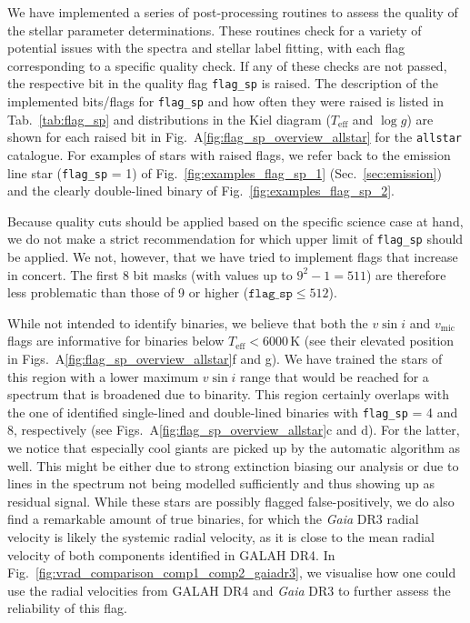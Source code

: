\documentclass[
  journal=pasa,
  manuscript=research-paper, %
  year=2024,
  volume=37
]{cup-journal}
\newcommand{\Teff}{$T_\mathrm{eff}$\xspace}
\newcommand{\logg}{$\log g$\xspace}
\newcommand{\vmic}{$v_\mathrm{mic}$\xspace}
\newcommand{\vsini}{$v \sin i$\xspace}
\newcommand{\Gaia}{\textit{Gaia}\xspace}
\begin{document}
We have implemented a series of post-processing routines to assess the quality of the stellar parameter determinations. These routines check for a variety of potential issues with the spectra and stellar label fitting, with each flag corresponding to a specific quality check. If any of these checks are not passed, the respective bit in the quality flag \texttt{flag\_sp} is raised. The description of the implemented bits/flags for \texttt{flag\_sp} and how often they were raised is listed in Tab.~\ref{tab:flag_sp} and distributions in the Kiel diagram (\Teff and \logg) are shown for each raised bit in Fig.~A\ref{fig:flag_sp_overview_allstar} for the \texttt{allstar} catalogue. For examples of stars with raised flags, we refer back to the emission line star (\texttt{flag\_sp} = 1) of Fig.~\ref{fig:examples_flag_sp_1} (Sec.~\ref{sec:emission}) and the clearly double-lined binary of Fig.~\ref{fig:examples_flag_sp_2}.

Because quality cuts should be applied based on the specific science case at hand, we do not make a strict recommendation for which upper limit of \texttt{flag\_sp} should be applied. We not, however, that we have tried to implement flags that increase in concert. The first 8 bit masks (with values up to $9^2-1 = 511$) are therefore less problematic than those of 9  or higher ($\texttt{flag\_sp} \leq 512$).



While not intended to identify binaries, we believe that both the \vsini and \vmic flags are informative for binaries below $T_\mathrm{eff} < 6000\,\mathrm{K}$ (see their elevated position in Figs.~A\ref{fig:flag_sp_overview_allstar}f and g). We have trained the stars of this region with a lower maximum \vsini range that would be reached for a spectrum that is broadened due to binarity. This region certainly overlaps with the one of identified single-lined and double-lined binaries with \texttt{flag\_sp} = 4 and 8, respectively (see Figs.~A\ref{fig:flag_sp_overview_allstar}c and d). For the latter, we notice that especially cool giants are picked up by the automatic algorithm as well. This might be either due to strong extinction biasing our analysis or due to lines in the spectrum not being modelled sufficiently and thus showing up as residual signal. While these stars are possibly flagged false-positively, we do also find a remarkable amount of true binaries, for which the \Gaia DR3 radial velocity is likely the systemic radial velocity, as it is close to the mean radial velocity of both components identified in GALAH DR4. In Fig.~\ref{fig:vrad_comparison_comp1_comp2_gaiadr3}, we visualise how one could use the radial velocities from GALAH DR4 and \Gaia DR3 to further assess the reliability of this flag.
\end{document}
